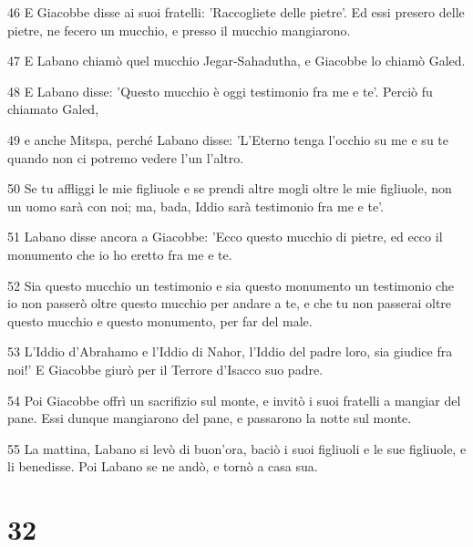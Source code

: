 \par 46 E Giacobbe disse ai suoi fratelli: 'Raccogliete delle pietre'. Ed essi presero delle pietre, ne fecero un mucchio, e presso il mucchio mangiarono.
\par 47 E Labano chiamò quel mucchio Jegar-Sahadutha, e Giacobbe lo chiamò Galed.
\par 48 E Labano disse: 'Questo mucchio è oggi testimonio fra me e te'. Perciò fu chiamato Galed,
\par 49 e anche Mitspa, perché Labano disse: 'L'Eterno tenga l'occhio su me e su te quando non ci potremo vedere l'un l'altro.
\par 50 Se tu affliggi le mie figliuole e se prendi altre mogli oltre le mie figliuole, non un uomo sarà con noi; ma, bada, Iddio sarà testimonio fra me e te'.
\par 51 Labano disse ancora a Giacobbe: 'Ecco questo mucchio di pietre, ed ecco il monumento che io ho eretto fra me e te.
\par 52 Sia questo mucchio un testimonio e sia questo monumento un testimonio che io non passerò oltre questo mucchio per andare a te, e che tu non passerai oltre questo mucchio e questo monumento, per far del male.
\par 53 L'Iddio d'Abrahamo e l'Iddio di Nahor, l'Iddio del padre loro, sia giudice fra noi!' E Giacobbe giurò per il Terrore d'Isacco suo padre.
\par 54 Poi Giacobbe offrì un sacrifizio sul monte, e invitò i suoi fratelli a mangiar del pane. Essi dunque mangiarono del pane, e passarono la notte sul monte.
\par 55 La mattina, Labano si levò di buon'ora, baciò i suoi figliuoli e le sue figliuole, e li benedisse. Poi Labano se ne andò, e tornò a casa sua.

\chapter{32}


